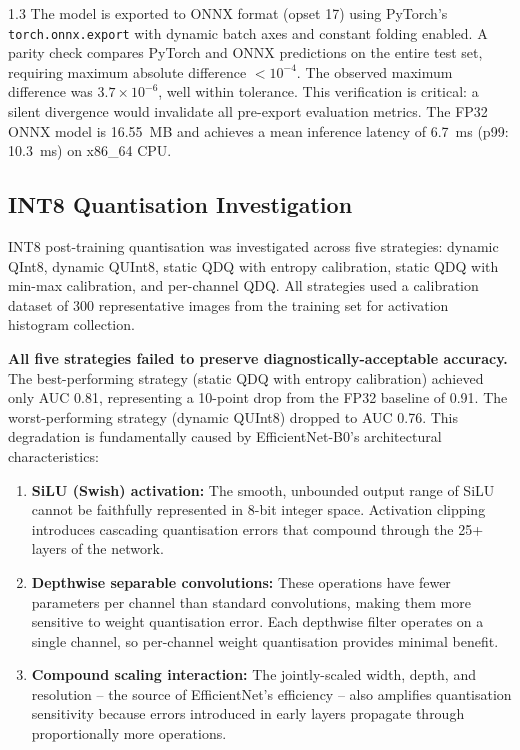 \begin{spacing}{1.3}
The model is exported to ONNX format (opset 17) using PyTorch's \texttt{torch.onnx.export} with dynamic batch axes and constant folding enabled. A parity check compares PyTorch and ONNX predictions on the entire test set, requiring maximum absolute difference $< 10^{-4}$. The observed maximum difference was \(3.7 \times 10^{-6}\), well within tolerance. This verification is critical: a silent divergence would invalidate all pre-export evaluation metrics. The FP32 ONNX model is 16.55~MB and achieves a mean inference latency of 6.7~ms (p99: 10.3~ms) on x86\_64 CPU.

\subsection{INT8 Quantisation Investigation}

\label{sec:int8_detail}
INT8 post-training quantisation was investigated across five strategies: dynamic QInt8, dynamic QUInt8, static QDQ with entropy calibration, static QDQ with min-max calibration, and per-channel QDQ. All strategies used a calibration dataset of 300 representative images from the training set for activation histogram collection.

\textbf{All five strategies failed to preserve diagnostically-acceptable accuracy.} The best-performing strategy (static QDQ with entropy calibration) achieved only AUC 0.81, representing a 10-point drop from the FP32 baseline of 0.91. The worst-performing strategy (dynamic QUInt8) dropped to AUC 0.76. This degradation is fundamentally caused by EfficientNet-B0's architectural characteristics:

\begin{enumerate}[leftmargin=*,nosep]
\item \textbf{SiLU (Swish) activation:} The smooth, unbounded output range of SiLU cannot be faithfully represented in 8-bit integer space. Activation clipping introduces cascading quantisation errors that compound through the 25+ layers of the network.
\item \textbf{Depthwise separable convolutions:} These operations have fewer parameters per channel than standard convolutions, making them more sensitive to weight quantisation error. Each depthwise filter operates on a single channel, so per-channel weight quantisation provides minimal benefit.
\item \textbf{Compound scaling interaction:} The jointly-scaled width, depth, and resolution -- the source of EfficientNet's efficiency -- also amplifies quantisation sensitivity because errors introduced in early layers propagate through proportionally more operations.
\end{enumerate}


\end{spacing}
